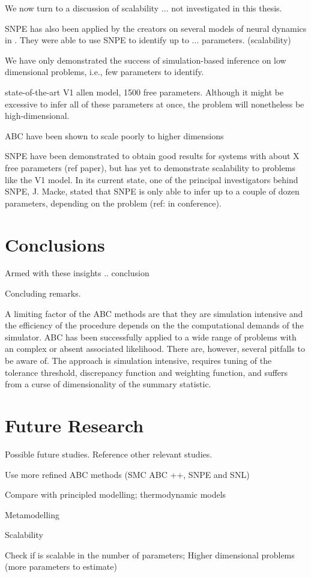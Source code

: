 We now turn to a discussion of scalability ... not investigated in this thesis. 

SNPE has also been applied by the creators on several models of neural dynamics in \cite{SNPE_applied}. They were able to use SNPE to identify up to ... parameters. (scalability)


We have only demonstrated the success of simulation-based inference on low dimensional problems, i.e., few parameters to identify. 

state-of-the-art V1 allen model, 1500 free parameters. Although it might be excessive to infer all of these parameters at once, the problem will nonetheless be high-dimensional. 

ABC have been shown to scale poorly to higher dimensions

SNPE have been demonstrated to obtain good results for systems with about X free parameters (ref paper), but has yet to demonstrate scalability to problems like the V1 model. In its current state, one of the principal investigators behind SNPE, J. Macke, stated that SNPE is only able to infer up to a couple of dozen parameters, depending on the problem (ref: in conference).

\chapter{Conclusions}\label{chap:conclusions}

Armed with these insights .. conclusion

Concluding remarks.

A limiting factor of the ABC methods are that they are simulation intensive and the efficiency of the procedure depends on the the computational demands of the simulator.  
ABC has been successfully applied to a wide range of problems with an complex or absent associated likelihood. There are, however, several pitfalls to be aware of. The approach is simulation intensive, requires tuning of the tolerance threshold, discrepancy function and weighting function, and suffers from a curse of dimensionality of the summary statistic. 

\chapter{Future Research}\label{chap:future}

Possible future studies. Reference other relevant studies. 

Use more refined ABC methods
(SMC ABC ++, SNPE and SNL)

Compare with principled modelling; thermodynamic models

Metamodelling

Scalability 

Check if is scalable in the number of parameters;
Higher dimensional problems (more parameters to estimate)

